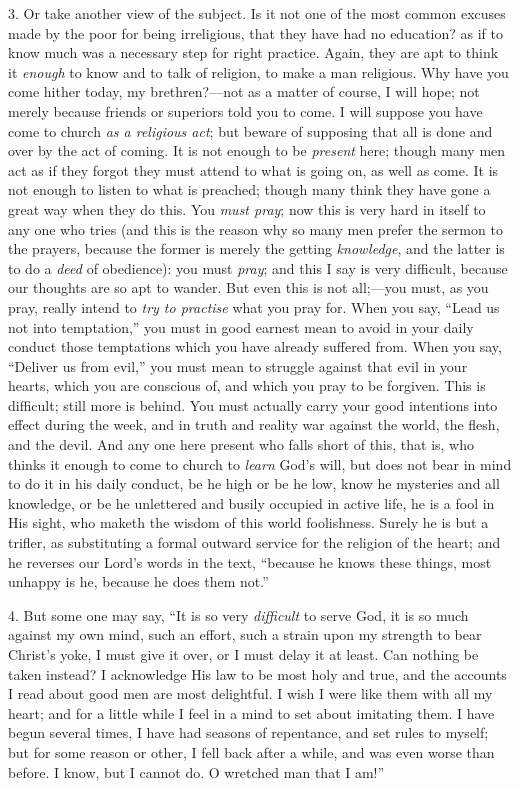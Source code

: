 3. Or take another view of the subject. Is it not one
of the most common excuses made by the poor for being
irreligious, that they have had no education? as if to
know much was a necessary step for right practice. Again,
they are apt to think it \emph{enough} to know and to
talk of religion, to make a man religious. Why have you
come hither today, my brethren?—not as a matter of
course, I will hope; not merely because friends or
superiors told you to come. I will suppose you have come
to church \emph{as a religious act}; but beware of
supposing that all is done and over by the act of coming.
It is not enough to be \emph{present} here; though many
men act as if they forgot they must attend to what is
going on, as well as come. It is not enough to listen to
what is preached; though many think they have gone a
great way when they do this. You \emph{must pray}; now
this is very hard in itself to any one who tries (and
this is the reason why so many men prefer the sermon to
the prayers, because the former is merely the getting \emph{knowledge},
and the latter is to do a \emph{deed} of obedience):
you must \emph{pray}; and this I say is very difficult,
because our thoughts are so apt to wander. But even this
is not all;—you must, as you pray, really intend to \emph{try
to practise} what you pray for. When you say,
``Lead us not into temptation,'' you must in good
earnest mean to avoid in your daily conduct those
temptations which you have already suffered from. When
you say, ``Deliver us from evil,'' you must mean
to struggle against that evil in your hearts, which you
are conscious of, and which you pray to be forgiven. This
is difficult; still more is behind. You must actually
carry your good intentions into effect during the week,
and in truth and reality war against the world, the
flesh, and the devil. And any one here present who falls
short of this, that is, who thinks it enough to come to
church to \emph{learn} God's will, but does not bear in
mind to do it in his daily conduct, be he high or be he
low, know he mysteries and all knowledge, or be he
unlettered and busily occupied in active life, he is a
fool in His sight, who maketh the wisdom of this world
foolishness. Surely he is but a trifler, as substituting
a formal outward service for the religion of the heart;
and he reverses our Lord's words in the text,
``because he knows these things, most unhappy is he,
because he does them not.''

4. But some one may say, ``It is so very \emph{difficult}
to serve God, it is so much against my own mind, such an
effort, such a strain upon my strength to bear Christ's
yoke, I must give it over, or I must delay it at least.
Can nothing be taken instead? I acknowledge His law to be
most holy and true, and the accounts I read about good
men are most delightful. I wish I were like them with all
my heart; and for a little while I feel in a mind to set
about imitating them. I have begun several times, I have
had seasons of repentance, and set rules to myself; but
for some reason or other, I fell back after a while, and
was even worse than before. I know, but I cannot do. O
wretched man that I am!''

